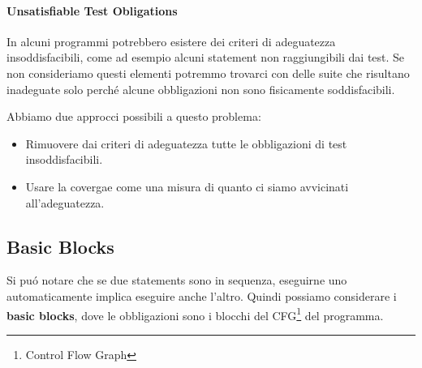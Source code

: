 
\paragraph*{Unsatisfiable Test Obligations}
In alcuni programmi potrebbero esistere dei criteri di adeguatezza insoddisfacibili, come ad esempio 
alcuni statement non raggiungibili dai test.
Se non consideriamo questi elementi potremmo trovarci con delle suite che risultano inadeguate solo perché alcune obbligazioni non sono fisicamente soddisfacibili.

Abbiamo due approcci possibili a questo problema:
\begin{itemize}
    \item Rimuovere dai criteri di adeguatezza tutte le obbligazioni di test insoddisfacibili.
    \item Usare la covergae come una misura di quanto ci siamo avvicinati all'adeguatezza.
\end{itemize}

\subsection{Basic Blocks}
Si puó notare che se due statements sono in sequenza, eseguirne uno automaticamente implica eseguire anche l'altro.
Quindi possiamo considerare i \textbf{basic blocks}, dove le obbligazioni sono i blocchi del CFG\footnote{Control Flow Graph} del programma.


